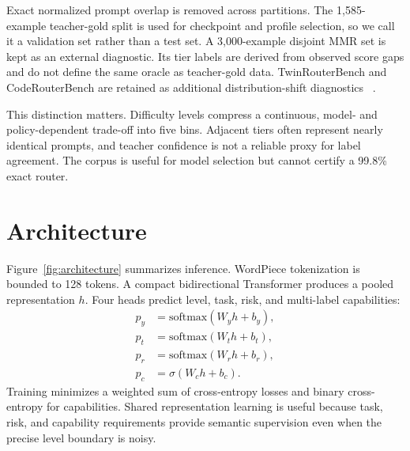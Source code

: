 \documentclass[10pt,twocolumn]{article}
\begin{document}
Exact normalized prompt overlap is removed across partitions. The 1,585-example
teacher-gold split is used for checkpoint and profile selection, so we call it a
validation set rather than a test set. A 3,000-example disjoint MMR set is kept as
an external diagnostic. Its tier labels are derived from observed score gaps and
do not define the same oracle as teacher-gold data. TwinRouterBench and
CodeRouterBench are retained as additional distribution-shift diagnostics
~\cite{twin,coderouter}.

This distinction matters. Difficulty levels compress a continuous, model- and
policy-dependent trade-off into five bins. Adjacent tiers often represent nearly
identical prompts, and teacher confidence is not a reliable proxy for label
agreement. The corpus is useful for model selection but cannot certify a 99.8\%
exact router.

\section{Architecture}
Figure~\ref{fig:architecture} summarizes inference. WordPiece tokenization is
bounded to 128 tokens. A compact bidirectional Transformer produces a pooled
representation $h$. Four heads predict level, task, risk, and multi-label
capabilities:
\begin{align}
 p_y &= \mathrm{softmax}(W_y h+b_y),\\
 p_t &= \mathrm{softmax}(W_t h+b_t),\\
 p_r &= \mathrm{softmax}(W_r h+b_r),\\
 p_c &= \sigma(W_c h+b_c).
\end{align}
Training minimizes a weighted sum of cross-entropy losses and binary
cross-entropy for capabilities. Shared representation learning is useful because
task, risk, and capability requirements provide semantic supervision even when
the precise level boundary is noisy.
\end{document}
